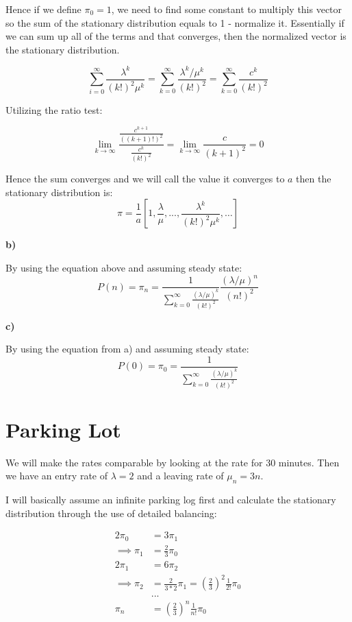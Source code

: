 \documentclass{article}
\begin{document}
Hence if we define $\pi_{0}=1$, we need to find some constant to multiply this vector
so the sum of the stationary distribution equals to 1 - normalize it. Essentially
if we can sum up all of the terms and that converges, then the normalized vector
is the stationary distribution.

\[
\sum_{i=0}^{\infty} \frac{\lambda^{k}}{(k!)^{2}\mu^{k}} = \sum_{k=0}^{\infty} \frac{\lambda^{k}/\mu^{k}}{(k!)^{2}} = \sum_{k=0}^{\infty} \frac{c^{k}}{(k!)^{2}}
\]

Utilizing the ratio test:

\[
\lim_{k \to \infty} \frac{\frac{c^{k+1}}{((k+1)!)^{2}}}{\frac{c^{k}}{(k!)^{2}}} = \lim_{k \to \infty} \frac{c}{(k+1)^{2}} = 0
\]

Hence the sum converges and we will call the value it converges to $a$ then the stationary distribution is:
\[
\pi = \frac{1}{a}[1,\frac{\lambda}{\mu},...,\frac{\lambda^{k}}{(k!)^{2}\mu^{k}},\dots]
\]

\textbf{b)}

By using the equation above and assuming steady state:
\[
P(n) =\pi_{n} = \frac{1}{\sum_{k=0}^{\infty} \frac{(\lambda/\mu)^{k}}{(k!)^{2}}}\frac{(\lambda/\mu)^{n}}{(n!)^{2}}
\]

\textbf{c)}

By using the equation from a) and assuming steady state:
\[
P(0) = \pi_{0} = \frac{1}{\sum_{k=0}^{\infty} \frac{(\lambda/\mu)^{k}}{(k!)^{2}}}
\]

\section{Parking Lot}

We will make the rates comparable by looking at the rate for 30 minutes.
Then we have an entry rate of $\lambda = 2$ and a leaving rate of $\mu_{n} = 3n$.

I will basically assume an infinite parking log first and calculate the stationary distribution through
the use of detailed balancing:

\begin{align}
2\pi_{0} &= 3\pi_{1}\\
\implies \pi_{1} &= \frac{2}{3}\pi_{0}\\
2\pi_{1} &= 6\pi_{2}\\
\implies \pi_{2} &= \frac{2}{3*2}\pi_{1} = \left(\frac{2}{3}\right)^{2}\frac{1}{2!}\pi_{0}\\
&...\\
\pi_{n} &= \left(\frac{2}{3}\right)^{n} \frac{1}{n!}\pi_{0}
\end{align}
\end{document}
